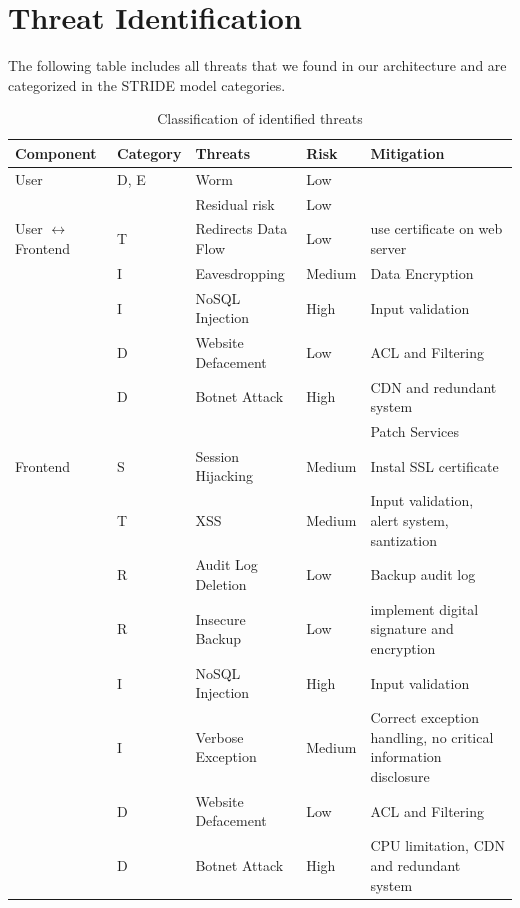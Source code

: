 \section{Threat Identification}
The following table includes all threats that we found in our architecture and are categorized in the STRIDE model categories.
\begin{longtable}[h!]{p{2.1cm} p{1.8cm} p{3cm} p{2cm} p{3.5cm}}
    \caption{\label{tab:threats-classification}Classification of identified threats}
    \endfirsthead
    \textbf{Component} & \textbf{Category} & \textbf{Threats} & \textbf{Risk} & \textbf{Mitigation} \\
    \endhead
    \hline
    User                & D, E & Worm & Low & \\
                        & & Residual risk & Low & \\
    \hline
    User \(\leftrightarrow\) Frontend   
                        & T & Redirects Data Flow & Low & use certificate on web server \\ 
                        & I & Eavesdropping & Medium & Data Encryption \\
                        & I & NoSQL Injection & High & Input validation \\
                        & D & Website Defacement & Low & ACL and Filtering \\
                        & D & Botnet Attack & High & CDN and redundant system \\
                        & & & & Patch Services \\
    \hline
    Frontend            & S & Session Hijacking & Medium & Instal SSL certificate \\
                        & T & XSS & Medium & Input validation, alert system, santization \\
                        & R & Audit Log Deletion & Low & Backup audit log \\
                        & R & Insecure Backup & Low & implement digital signature and encryption \\
                        & I & NoSQL Injection & High & Input validation \\
                        & I & Verbose Exception & Medium & Correct exception handling, no critical information disclosure \\
                        & D & Website Defacement & Low & ACL and Filtering \\
                        & D & Botnet Attack & High & CPU limitation, CDN and redundant system \\

\end{longtable}
